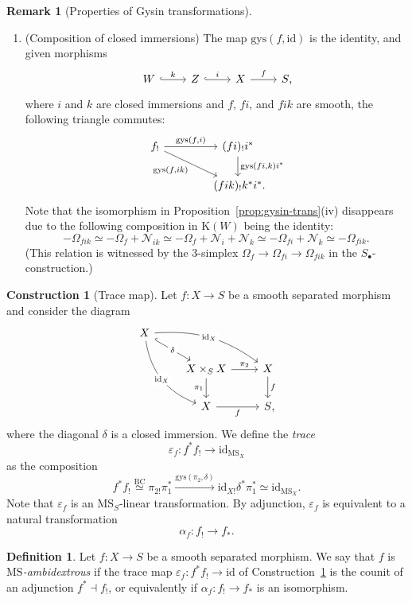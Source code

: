 \documentclass{amsart}
\numberwithin{equation}{section}
\theoremstyle{plain}
\theoremstyle{definition}
\newtheorem{definition}[equation]{Definition}
\newtheorem{construction}[equation]{Construction}
\newtheorem{remark}[equation]{Remark}
\let\scr=\mathcal
\def\id{\mathrm{id}}
\def\K{\mathrm{K}{}}
\def\MS{\mathrm{MS}}
\let\epsilon=\varepsilon
\begin{document}
\begin{remark}[Properties of Gysin transformations]
\begin{enumerate}
\[		\]
		\item (Composition of closed immersions)
		The map $\mathrm{gys}(f,\id)$ is the identity, and given morphisms
		\[
		\begin{tikzcd}
			W \ar[hook]{r}{k} & Z \ar[hook]{r}{i} & X \ar{r}{f} & S\rlap,
		\end{tikzcd}
		\]
		where $i$ and $k$ are closed immersions and $f$, $fi$, and $fik$ are smooth, the following triangle commutes:
		\[
		\begin{tikzcd}[column sep=4em]
			f_! \ar{r}{\mathrm{gys}(f,i)} \ar{dr}[swap]{\mathrm{gys}(f,ik)} & (fi)_!i^* \ar{d}{\mathrm{gys}(fi,k)i^*} \\
			& (fik)_!k^*i^*\rlap.
		\end{tikzcd}
		\]
		Note that the isomorphism in Proposition~\ref{prop:gysin-trans}(iv) disappears due to the following composition in $\K(W)$ being the identity:
		\[
		-\Omega_{fik} \simeq -\Omega_f+\scr N_{ik} \simeq -\Omega_f+\scr N_i+\scr N_k \simeq -\Omega_{fi} +\scr N_k \simeq -\Omega_{fik}.
		\]
		(This relation is witnessed by the 3-simplex $\Omega_{f} \to \Omega_{fi} \to \Omega_{fik}$ in the $S_\bullet$-construction.)
	\end{enumerate}
\end{remark}

\begin{construction}[Trace map]
	\label{ctr:trace}
	Let $f\colon X\to S$ be a smooth separated morphism and consider the diagram
	\[
	\begin{tikzcd}
	X \ar[hook]{dr}[description]{\delta} \ar[bend left=20]{drr}[description]{\id_X} \ar[bend right]{ddr}[description]{\id_X} & & \\
	& X\times_SX \ar{d}[swap]{\pi_1} \ar{r}{\pi_2} & X \ar{d}{f} \\
	& X \ar{r}[swap]{f} & S\rlap,
	\end{tikzcd}
	\]
	where the diagonal $\delta$ is a closed immersion.
	We define the \emph{trace}
	\[
	\epsilon_f\colon f^*f_! \to \id_{\MS_X}
	\]
	as the composition
	\[
	f^*f_!\overset{\mathrm{BC}}{\simeq} \pi_{2!}\pi_1^*
	\xrightarrow{\mathrm{gys}(\pi_2,\delta)}
	\id_{X!}\delta^*\pi_1^*\simeq \id_{\MS_X}.
	\]
	Note that $\epsilon_f$ is an $\MS_S$-linear transformation.
	By adjunction, $\epsilon_f$ is equivalent to a natural transformation
	\[
	\alpha_f\colon f_!\to f_*.
	\]
\end{construction}

\begin{definition}
	Let $f\colon X\to S$ be a smooth separated morphism. We say that $f$ is \emph{$\MS$-ambidextrous} if the trace map $\epsilon_f\colon f^*f_!\to\id$ of Construction~\ref{ctr:trace} is the counit of an adjunction $f^*\dashv f_!$, or equivalently if $\alpha_f\colon f_!\to f_*$ is an isomorphism.
\end{definition}
\end{document}
